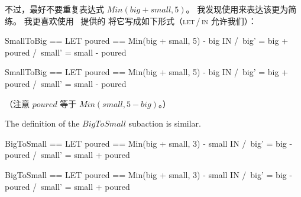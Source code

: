 \begin{ch}
  不过，最好不要重复表达式 $Min(big + small, 5)$。
  我发现使用来表达该\tlaaction{}更为简练。
  我更喜欢使用 \tlaplus\ 提供的
  将它写成如下形式（\textsc{let}\,/\,\textsc{in} 允许我们）：
  \medskip
  \begin{twocols}%
  \begin{notla}
  SmallToBig == 
    LET poured == Min(big + small, 5) - big
    IN  /\ big'   = big + poured
	/\ small' = small - poured
  \end{notla}
  \begin{tlatex}
  \end{tlatex}
  \midcol
  \begin{verbatim*}
  SmallToBig == 
    LET poured == Min(big + small, 5) - big
    IN  /\ big'   = big + poured
	/\ small' = small - poured
  \end{verbatim*}
  \end{twocols}
   \medskip
  （注意 $poured$ 等于 $Min(small, 5-big)$。）
\end{ch}
\begin{en}
The definition of the $BigToSmall$ subaction is similar.
 \medskip
\begin{twocols}
\begin{notla}
BigToSmall == 
  LET poured == Min(big + small, 3) - small
  IN  /\ big'   = big - poured
      /\ small' = small + poured
\end{notla}
\begin{tlatex}
%
%
%
\end{tlatex}
\midcol
\begin{verbatim*}
BigToSmall == 
  LET poured == Min(big + small, 3) - small
  IN  /\ big'   = big - poured
      /\ small' = small + poured
\end{verbatim*}
\end{twocols}
 \medskip
\end{en}
